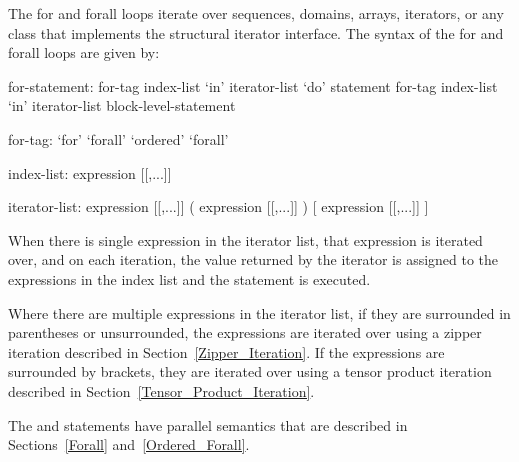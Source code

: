 The for and forall loops iterate over sequences, domains, arrays,
iterators, or any class that implements the structural iterator
interface.  The syntax of the for and forall loops are given by:
\begin{syntax}
for-statement:
  for-tag index-list `in' iterator-list `do' statement
  for-tag index-list `in' iterator-list block-level-statement

for-tag:
  `for'
  `forall'
  `ordered' `forall'

index-list:
  expression [[,...]]

iterator-list:
  expression [[,...]]
  ( expression [[,...]] )
  [ expression [[,...]] ]
\end{syntax}

When there is single expression in the iterator list, that expression
is iterated over, and on each iteration, the value returned by the
iterator is assigned to the expressions in the index list and the
statement is executed.

Where there are multiple expressions in the iterator list, if they are
surrounded in parentheses or unsurrounded, the expressions are
iterated over using a zipper iteration described in
Section~\ref{Zipper_Iteration}.  If the expressions are surrounded by
brackets, they are iterated over using a tensor product iteration
described in Section~\ref{Tensor_Product_Iteration}.

The  and  statements have parallel
semantics that are described in Sections~\ref{Forall}
and~\ref{Ordered_Forall}.
